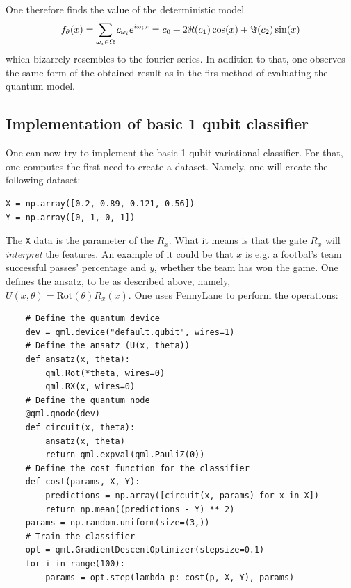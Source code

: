 One therefore finds the value of the deterministic model
\begin{equation}
  f_\theta(x) = \sum_{\omega_i \in \Omega} c_{\omega_i} e^{i\omega_ix} = 
  c_0 + 2 \real(c_1)\cos(x) + \imaginary(c_2)\sin(x)
\end{equation}
which bizarrely resembles to the fourier series. In addition to that, one observes the 
same form of the obtained result as in the firs method of evaluating the quantum model.

\subsection*{Implementation of basic 1 qubit classifier}
One can now try to implement the basic 1 qubit variational classifier.
For that, one computes the first need to create a dataset. Namely, 
one will create the following dataset:
\begin{verbatim}
X = np.array([0.2, 0.89, 0.121, 0.56])
Y = np.array([0, 1, 0, 1])
\end{verbatim}

The \texttt{X} data is the parameter of the $R_x$. What it means is that the gate $R_x$ will \textit{interpret}
the features. An example of it could be that $x$ is e.g. a footbal's team successful passes' percentage and $y$, 
whether the team has won the game.
One defines the ansatz, to be as described above, namely, $U(x,\theta)=\text{Rot}(\theta)R_x(x)$. 
One uses PennyLane to perform the operations:

\begin{listing}[ht!]
  \begin{verbatim}
    # Define the quantum device
    dev = qml.device("default.qubit", wires=1)
    # Define the ansatz (U(x, theta))
    def ansatz(x, theta):
        qml.Rot(*theta, wires=0)
        qml.RX(x, wires=0)
    # Define the quantum node
    @qml.qnode(dev)
    def circuit(x, theta):
        ansatz(x, theta)
        return qml.expval(qml.PauliZ(0))
    # Define the cost function for the classifier
    def cost(params, X, Y):
        predictions = np.array([circuit(x, params) for x in X])
        return np.mean((predictions - Y) ** 2)
    params = np.random.uniform(size=(3,))
    # Train the classifier
    opt = qml.GradientDescentOptimizer(stepsize=0.1)
    for i in range(100):
        params = opt.step(lambda p: cost(p, X, Y), params)

  \end{verbatim}
\end{listing}

